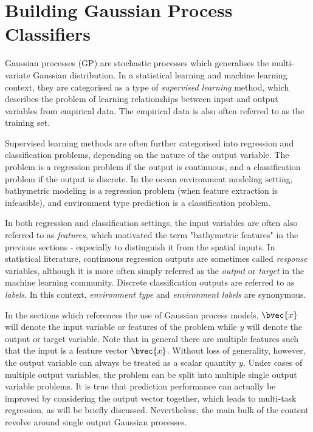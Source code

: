 \chapter{Building Gaussian Process Classifiers}
\label{BuildingGaussianProcessClassifiers}
	

	Gaussian processes (GP) are stochastic processes which generalises the multi-variate Gaussian distribution. In a statistical learning and machine learning context, they are categorised as a type of \textit{supervised learning} method, which describes the problem of learning relationships between input and output variables from empirical data. The empirical data is also often referred to as the training set.
	
	Supervised learning methods are often further categorised into regression and classification problems, depending on the nature of the output variable. The problem is a regression problem if the output is continuous, and a classification problem if the output is discrete. In the ocean environment modeling setting, bathymetric modeling is a regression problem (when feature extraction is infeasible), and environment type prediction is a classification problem.
	
	In both regression and classification settings, the input variables are often also referred to as \textit{features}, which motivated the term "bathymetric features" in the previous sections - especially to distinguish it from the spatial inputs. In statistical literature, continuous regression outputs are sometimes called \textit{response} variables, although it is more often simply referred as the \textit{output} or \textit{target} in the machine learning community. Discrete classification outputs are referred to as \textit{labels}. In this context, \textit{environment type} and \textit{environment labels} are synonymous. 
	
	In the sections which references the use of Gaussian process models, $\bvec{x}$ will denote the input variable or features of the problem while $y$ will denote the output or target variable. Note that in general there are multiple features such that the input is a feature vector $\bvec{x}$. Without loss of generality, however, the output variable can always be treated as a scalar quantity $y$. Under cases of multiple output variables, the problem can be split into multiple single output variable problems. It is true that prediction performance can actually be improved by considering the output vector together, which leads to multi-task regression, as will be briefly discussed. Nevertheless, the main bulk of the content revolve around single output Gaussian processes.
	

